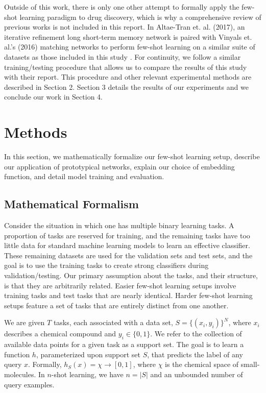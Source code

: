 \documentclass{article}
\begin{document}
Outside of this work, there is only one other attempt to formally apply the few-shot learning paradigm to drug discovery, which is why a comprehensive review of previous works is not included in this report.  In Altae-Tran et. al. (2017), an iterative refinement long short-term memory network is paired with Vinyals et. al.'s (2016) matching networks to perform few-shot learning on a similar suite of datasets as those included in this study \cite{altae2017low,vinyals2016matching}.  For continuity, we follow a similar training/testing procedure that allows us to compare the results of this study with their report.  This procedure and other relevant experimental methods are described in Section 2.  Section 3 details the results of our experiments and we conclude our work in Section 4.

\section{Methods}
In this section, we mathematically formalize our few-shot learning setup, describe our application of prototypical networks, explain our choice of embedding function, and detail model training and evaluation.
\subsection{Mathematical Formalism}

Consider the situation in which one has multiple binary learning tasks.  A proportion of tasks are reserved for training, and the remaining tasks have too little data for standard machine learning models to learn an effective classifier. These remaining datasets are used for the validation sets and test sets, and the goal is to use the training tasks to create strong classifiers during validation/testing.  Our primary assumption about the tasks, and their structure, is that they are arbitrarily related.  Easier few-shot learning setups involve training tasks and test tasks that are nearly identical.  Harder few-shot learning setups feature a set of tasks that are entirely distinct from one another.


We are given $T$ tasks, each associated with a data set, $S = \{(x_i,y_i)\}^N$, where $x_i$ describes a chemical compound and $y_i \in \{0,1\}$.  We refer to the collection of available data points for a given task as a support set.  The goal is to learn a function $h$, parameterized upon support set $S$, that predicts the label of any query $x$.  Formally, $h_S(x) = \chi \to [0,1]$, where $\chi$ is the chemical space of small-molecules.  In $n$-shot learning, we have $n = |S|$ and an unbounded number of query examples.
\end{document}
